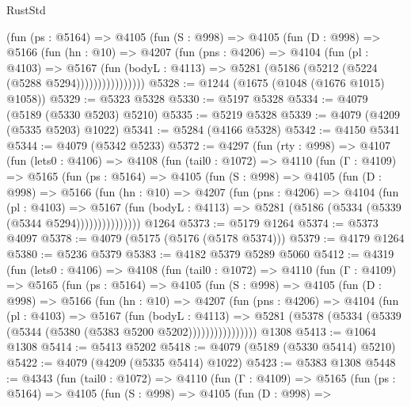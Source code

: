 \begin{lexlean}{RustStd}
\begin{coremodule}
{\begin{coremodule}
{{{{{{{{{{{{{{              (fun (ps : @5164) =>
              @4105
                (fun (S : @998) =>
                @4105
                  (fun (D : @998) =>
                  @5166
                    (fun (hn : @10) =>
                    @4207
                      (fun (pns : @4206) =>
                      @4104
                        (fun (pl : @4103) =>
                        @5167
                          (fun (bodyL : @4113) =>
                          @5281 (@5186 (@5212 (@5224 (@5288 @5294))))))))))))))))
@5328 := @1244 (@1675 (@1048 (@1676 @1015) @1058))
@5329 := @5323 @5328
@5330 := @5197 @5328
@5334 := @4079 (@5189 (@5330 @5203) @5210)
@5335 := @5219 @5328
@5339 := @4079 (@4209 (@5335 @5203) @1022)
@5341 := @5284 (@4166 @5328)
@5342 := @4150 @5341
@5344 := @4079 (@5342 @5233)
@5372 := @4297
    (fun (rty : @998) =>
    @4107
      (fun (lets0 : @4106) =>
      @4108
        (fun (tail0 : @1072) =>
        @4110
          (fun (Γ : @4109) =>
          @5165
            (fun (ps : @5164) =>
            @4105
              (fun (S : @998) =>
              @4105
                (fun (D : @998) =>
                @5166
                  (fun (hn : @10) =>
                  @4207
                    (fun (pns : @4206) =>
                    @4104
                      (fun (pl : @4103) =>
                      @5167
                        (fun (bodyL : @4113) =>
                        @5281 (@5186 (@5334 (@5339 (@5344 @5294)))))))))))))))
    @1264
@5373 := @5179 @1264
@5374 := @5373 @4097
@5378 := @4079 (@5175 (@5176 (@5178 @5374)))
@5379 := @4179 @1264
@5380 := @5236 @5379
@5383 := @4182 @5379 @5289 @5060
@5412 := @4319
    (fun (lets0 : @4106) =>
    @4108
      (fun (tail0 : @1072) =>
      @4110
        (fun (Γ : @4109) =>
        @5165
          (fun (ps : @5164) =>
          @4105
            (fun (S : @998) =>
            @4105
              (fun (D : @998) =>
              @5166
                (fun (hn : @10) =>
                @4207
                  (fun (pns : @4206) =>
                  @4104
                    (fun (pl : @4103) =>
                    @5167
                      (fun (bodyL : @4113) =>
                      @5281 (@5378 (@5334 (@5339 (@5344 (@5380 (@5383 @5200 @5202))))))))))))))))
    @1308
@5413 := @1064 @1308
@5414 := @5413 @5202
@5418 := @4079 (@5189 (@5330 @5414) @5210)
@5422 := @4079 (@4209 (@5335 @5414) @1022)
@5423 := @5383 @1308
@5448 := @4343
    (fun (tail0 : @1072) =>
    @4110
      (fun (Γ : @4109) =>
      @5165
        (fun (ps : @5164) =>
        @4105
          (fun (S : @998) =>
          @4105
            (fun (D : @998) =>
}}}}}}}}}}}}}}
\end{coremodule}}
\end{coremodule}
\end{lexlean}
